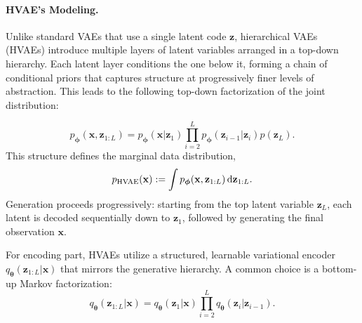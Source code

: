 \paragraph{HVAE's Modeling.}
Unlike standard VAEs that use a single latent code $\mathbf{z}$, hierarchical VAEs (HVAEs) introduce multiple layers of latent variables arranged in a top-down hierarchy.  
Each latent layer conditions the one below it, forming a chain of conditional priors that captures structure at progressively finer levels of abstraction.  
This leads to the following top-down factorization of the joint distribution:

\[
p_{\bm{\phi}}(\mathbf{x}, \mathbf{z}_{1:L}) = p_{\bm{\phi}}(\mathbf{x} | \mathbf{z}_1) \prod_{i=2}^{L} p_{\bm{\phi}}(\mathbf{z}_{i-1}|\mathbf{z}_i)   p(\mathbf{z}_L).
\]
This structure defines the marginal data distribution,
\[
p_{\text{HVAE}}(\mathbf{x}) := \int p_{\bm{\phi}}(\mathbf{x}, \mathbf{z}_{1:L}) \mathop{}\!\mathrm{d} \mathbf{z}_{1:L}.
\]
 Generation proceeds progressively: starting from the top latent variable $ \mathbf{z}_L $, each latent is decoded sequentially down to $ \mathbf{z}_1 $, followed by generating the final observation $ \mathbf{x} $.

For encoding part, HVAEs utilize a structured, learnable variational encoder $ q_{\bm{\theta}}(\mathbf{z}_{1:L}|\mathbf{x}) $ that mirrors the generative hierarchy. A common choice is a bottom-up Markov factorization:
\[
q_{\bm{\theta}}(\mathbf{z}_{1:L} | \mathbf{x}) = q_{\bm{\theta}}(\mathbf{z}_1 | \mathbf{x}) \prod_{i=2}^{L} q_{\bm{\theta}}(\mathbf{z}_i | \mathbf{z}_{i-1}).
\]

